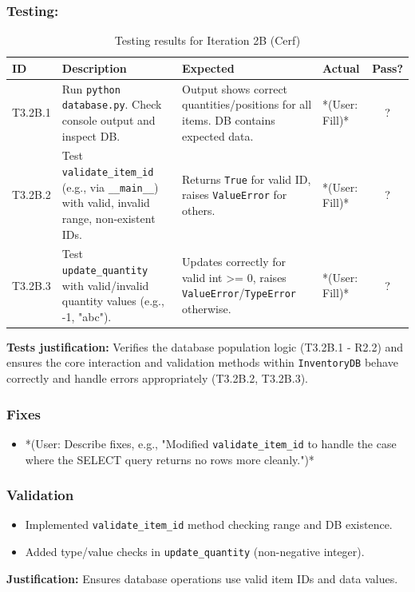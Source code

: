 \subsubsection{Testing:}
\begin{table}[htbp]
	\centering
	\begin{tabularx}{\textwidth}{|l|X|p{4.5cm}|p{1.5cm}|c|}
		\hline
		\textbf{ID} & \textbf{Description} & \textbf{Expected} & \textbf{Actual} & \textbf{Pass?} \\
		\hline
		T3.2B.1 & Run \verb|python database.py|. Check console output and inspect DB. & Output shows correct quantities/positions for all items. DB contains expected data. & *(User: Fill)* & ? \\
		\hline
		T3.2B.2 & Test \verb|validate_item_id| (e.g., via \verb|__main__|) with valid, invalid range, non-existent IDs. & Returns \verb|True| for valid ID, raises \verb|ValueError| for others. & *(User: Fill)* & ? \\
		\hline
		T3.2B.3 & Test \verb|update_quantity| with valid/invalid quantity values (e.g., -1, "abc"). & Updates correctly for valid int >= 0, raises \verb|ValueError|/\verb|TypeError| otherwise. & *(User: Fill)* & ? \\
		\hline
	\end{tabularx}
	\caption{Testing results for Iteration 2B (Cerf)}
\end{table}
\textbf{Tests justification:} Verifies the database population logic (T3.2B.1 - R2.2) and ensures the core interaction and validation methods within \verb|InventoryDB| behave correctly and handle errors appropriately (T3.2B.2, T3.2B.3).

\subsubsection{Fixes}
\begin{itemize}
	\item *(User: Describe fixes, e.g., "Modified \verb|validate_item_id| to handle the case where the SELECT query returns no rows more cleanly.")*
\end{itemize}

\subsubsection{Validation}
\begin{itemize}
	\item Implemented \verb|validate_item_id| method checking range and DB existence.
	\item Added type/value checks in \verb|update_quantity| (non-negative integer).
\end{itemize}
\textbf{Justification:} Ensures database operations use valid item IDs and data values.

